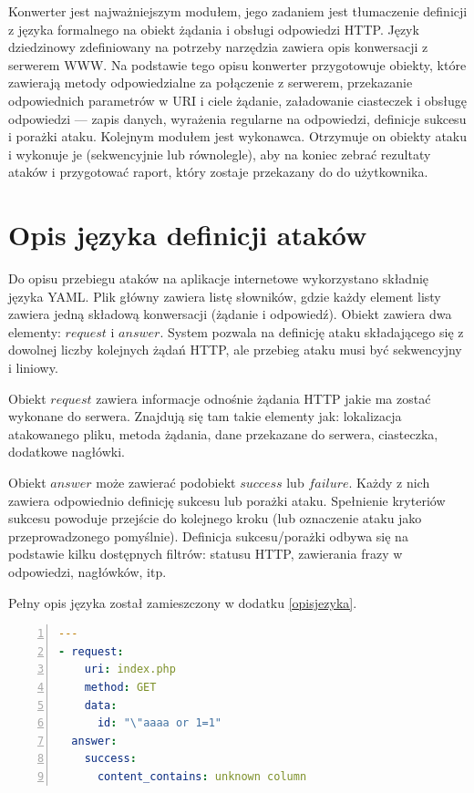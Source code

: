 \documentclass[11pt,a4paper,polish,thesis]{dcsbook}
\begin{document}
Konwerter jest najważniejszym modułem, jego zadaniem jest tłumaczenie definicji z języka formalnego na obiekt żądania i obsługi odpowiedzi HTTP. Język dziedzinowy zdefiniowany na potrzeby narzędzia zawiera opis konwersacji z serwerem WWW. Na podstawie tego opisu konwerter przygotowuje obiekty, które zawierają metody odpowiedzialne za połączenie z serwerem, przekazanie odpowiednich parametrów w URI i ciele żądanie, załadowanie ciasteczek i obsługę odpowiedzi --- zapis danych, wyrażenia regularne na odpowiedzi, definicje sukcesu i porażki ataku.
Kolejnym modułem jest wykonawca. Otrzymuje on obiekty ataku i wykonuje je (sekwencyjnie lub równolegle), aby na koniec zebrać rezultaty ataków i przygotować raport, który zostaje przekazany do do użytkownika.
 
\section{Opis języka definicji ataków} 
Do opisu przebiegu ataków na aplikacje internetowe wykorzystano składnię języka YAML.
Plik główny zawiera listę słowników, gdzie każdy element listy zawiera jedną składową konwersacji (żądanie i odpowiedź). Obiekt zawiera dwa elementy: $request$ i $answer$. System pozwala na definicję ataku składającego się z dowolnej liczby kolejnych żądań HTTP, ale przebieg ataku musi być sekwencyjny i liniowy.

Obiekt $request$ zawiera informacje odnośnie żądania HTTP jakie ma zostać wykonane do serwera. Znajdują się tam takie elementy jak: lokalizacja atakowanego pliku, metoda żądania, dane przekazane do serwera, ciasteczka, dodatkowe nagłówki.

Obiekt $answer$ może zawierać podobiekt $success$ lub $failure$. Każdy z nich zawiera odpowiednio definicję sukcesu lub porażki ataku. Spełnienie kryteriów sukcesu powoduje przejście do kolejnego kroku (lub oznaczenie ataku jako przeprowadzonego pomyślnie). Definicja sukcesu/porażki odbywa się na podstawie kilku dostępnych filtrów: statusu HTTP, zawierania frazy w odpowiedzi, nagłówków, itp.

Pełny opis języka został zamieszczony w dodatku \ref{opisjezyka}.

\begin{lstlisting}[language=YAML,frame=single,label=def1,numbers=left,caption=przykład podstawowej definicji ataku]
---
- request:
    uri: index.php
    method: GET
    data:
      id: "\"aaaa or 1=1"
  answer:
    success:
      content_contains: unknown column
\end{lstlisting}
\end{document}
